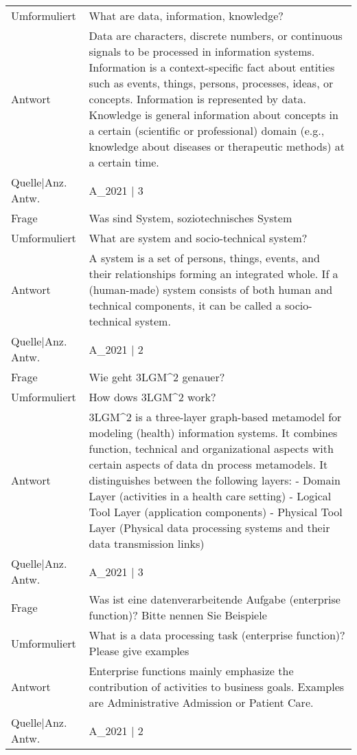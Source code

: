 {\begin{landscape}
\begin{longtable}{p{3cm}p{}}
    Umformuliert & What are data, information, knowledge? \\
    Antwort & Data are characters, discrete numbers, or continuous signals to be processed in information systems.
    Information is a context-specific fact about entities such as events, things, persons, processes, ideas, or concepts.
    Information is represented by data.
    Knowledge is general information about concepts in a certain (scientific or professional) domain (e.g., knowledge about diseases or therapeutic methods) at a certain time.\\
    Quelle|Anz. Antw. &  A\_2021  | 3 \\
    \midrule
    Frage & Was sind System, soziotechnisches System \\
    Umformuliert & What are system and socio-technical system? \\
    Antwort & A system is a set of persons, things, events, and their relationships forming an integrated whole.
    If a (human-made) system consists of both human and technical components, it can be called a socio-technical system.\\
    Quelle|Anz. Antw. &  A\_2021  | 2 \\
    \midrule
    Frage & Wie geht 3LGM\textasciicircum{}2 genauer? \\
    Umformuliert & How dows 3LGM\textasciicircum{}2 work? \\
    Antwort & 3LGM\textasciicircum{}2 is a three-layer graph-based metamodel for modeling (health) information systems.
    It combines function, technical and organizational aspects with certain aspects of data dn process metamodels.
    It distinguishes between the following layers:
    - Domain Layer (activities in a health care setting)
    - Logical Tool Layer (application components)
    - Physical Tool Layer (Physical data processing systems and their data transmission links) \\
    Quelle|Anz. Antw. &  A\_2021  | 3 \\
    \midrule
    Frage & Was ist eine datenverarbeitende Aufgabe (enterprise function)? Bitte nennen Sie Beispiele \\
    Umformuliert & What is a data processing task (enterprise function)? Please give examples \\
    Antwort & Enterprise functions mainly emphasize the contribution of activities to business goals.
    Examples are Administrative Admission or Patient Care.\\
    Quelle|Anz. Antw. &  A\_2021  | 2 \\

\end{longtable}
\end{landscape}}

